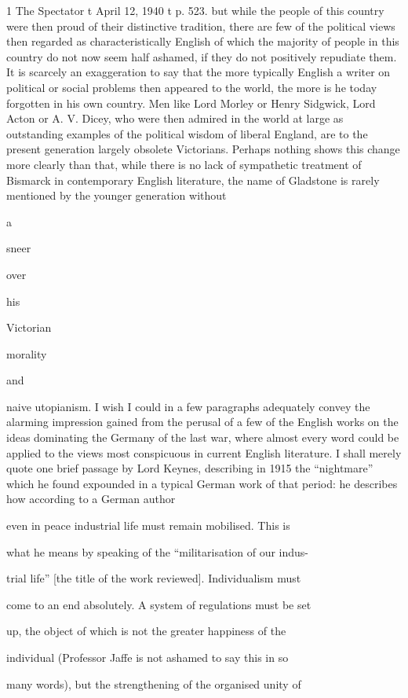 \documentclass[11pt,openany]{book}
\begin{document}
1 The Spectator t April 12, 1940 t p. 523. but while the people of this country were then proud of their distinctive tradition, there are few of the political views then regarded as characteristically English of which the majority of people in this country do not now seem half ashamed, if they do not positively repudiate them. It is scarcely an exaggeration to say that the more typically English a writer on political or social problems then appeared to the world, the more is he today forgotten in his own country. Men like Lord Morley or Henry Sidgwick, Lord Acton or A. V. Dicey, who were then admired in the world at large as outstanding examples of the political wisdom of liberal England, are to the present generation largely obsolete Victorians. Perhaps nothing shows this change more clearly than that, while there is no lack of sympathetic treatment of Bismarck in contemporary English literature, the name of Gladstone is rarely mentioned by the younger generation without

a

sneer

over

his

Victorian

morality

and

naive utopianism. I wish I could in a few paragraphs adequately convey the alarming impression gained from the perusal of a few of the English works on the ideas dominating the Germany of the last war, where almost every word could be applied to the views most conspicuous in current English literature. I shall merely quote one brief passage by Lord Keynes, describing in 1915 the ``nightmare'' which he found expounded in a typical German work of that period: he describes how according to a German author

even in peace industrial life must remain mobilised. This is

what he means by speaking of the ``militarisation of our indus-

trial life'' [the title of the work reviewed]. Individualism must

come to an end absolutely. A system of regulations must be set

up, the object of which is not the greater happiness of the

individual (Professor Jaffe is not ashamed to say this in so

many words), but the strengthening of the organised unity of
\end{document}
